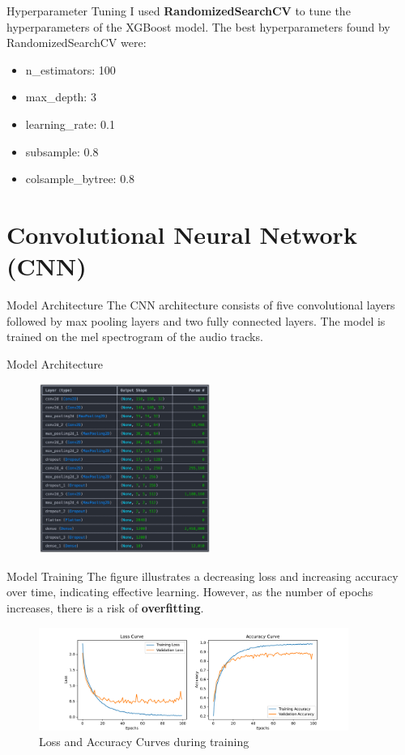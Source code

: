 \documentclass{beamer}
\begin{document}
\begin{frame}{Hyperparameter Tuning}
  I used \textbf{RandomizedSearchCV} to tune the hyperparameters of the XGBoost model. The best hyperparameters found by RandomizedSearchCV were:
  \begin{itemize}
    \item n\_estimators: 100
    \item max\_depth: 3
    \item learning\_rate: 0.1
    \item subsample: 0.8
    \item colsample\_bytree: 0.8
  \end{itemize}
\end{frame}

\section{Convolutional Neural Network (CNN)}
\begin{frame}{Model Architecture}
  The CNN architecture consists of five convolutional layers followed by max pooling layers and two fully connected layers. The model is trained on the mel spectrogram of the audio tracks.
\end{frame}

\begin{frame}{Model Architecture}
  \begin{figure}
    \centering
    \includegraphics[width=0.5\textwidth]{images/model_architecture.jpg}
  \end{figure}
\end{frame}

\begin{frame}{Model Training}
  The figure illustrates a decreasing loss and increasing accuracy over time, indicating effective learning. However, as the number of epochs increases, there is a risk of \textbf{overfitting}.
  \begin{figure}
    \centering
    \includegraphics[width=0.9\textwidth]{images/loss_accuracy.pdf}
    \caption{Loss and Accuracy Curves during training}
    \label{fig:loss_accuracy}
  \end{figure}
\end{frame}
\end{document}
